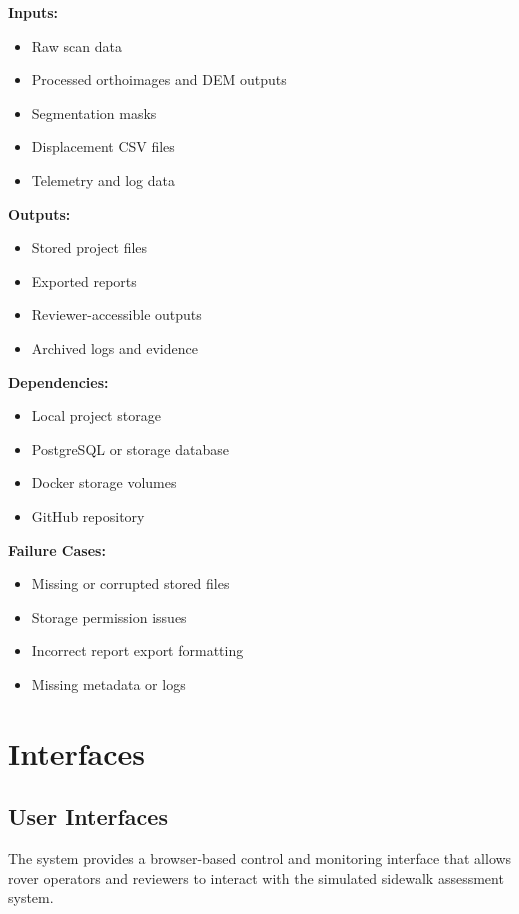 \documentclass{article}
\begin{document}
\textbf{Inputs:}

\begin{itemize}
    \item Raw scan data
    \item Processed orthoimages and DEM outputs
    \item Segmentation masks
    \item Displacement CSV files
    \item Telemetry and log data
\end{itemize}

\textbf{Outputs:}

\begin{itemize}
    \item Stored project files
    \item Exported reports
    \item Reviewer-accessible outputs
    \item Archived logs and evidence
\end{itemize}

\textbf{Dependencies:}

\begin{itemize}
    \item Local project storage
    \item PostgreSQL or storage database
    \item Docker storage volumes
    \item GitHub repository
\end{itemize}

\textbf{Failure Cases:}

\begin{itemize}
    \item Missing or corrupted stored files
    \item Storage permission issues
    \item Incorrect report export formatting
    \item Missing metadata or logs
\end{itemize}

\section{Interfaces}

\subsection{User Interfaces}

The system provides a browser-based control and monitoring interface that allows rover operators and reviewers to interact with the simulated sidewalk assessment system.
\end{document}
